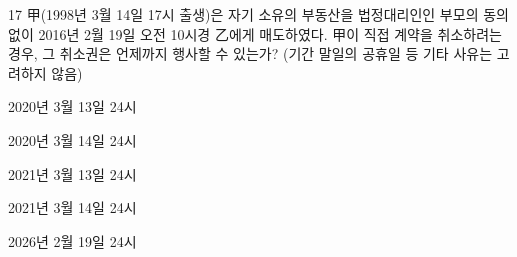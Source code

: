 \begin{question}{17}
甲(1998년 3월 14일 17시 출생)은 자기 소유의 부동산을 법정대리인인 부모의 동의 없이 2016년 2월 19일 오전 10시경 乙에게 매도하였다. 甲이 직접 계약을 취소하려는 경우, 그 취소권은 언제까지 행사할 수 있는가? (기간 말일의 공휴일 등 기타 사유는 고려하지 않음)
\begin{choices}
  \item 2020년 3월 13일 24시
  \item 2020년 3월 14일 24시
  \item 2021년 3월 13일 24시
  \item 2021년 3월 14일 24시
  \item 2026년 2월 19일 24시
\end{choices}
\end{question}
